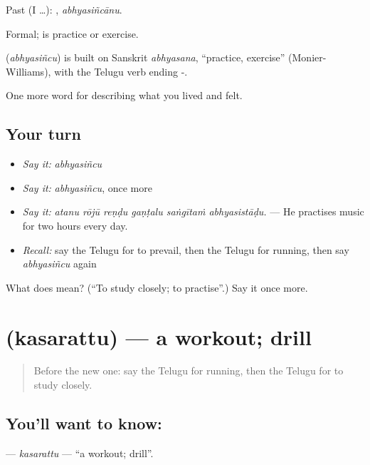 Past (I …): , \emph{abhyasiñcānu}.

Formal;  is practice or exercise.

\begin{cousinweb}
\textbf{} (\emph{abhyasiñcu}) is built on Sanskrit \emph{abhyasana}, \textquotedblleft{}practice, exercise\textquotedblright{} (Monier-Williams), with the Telugu verb ending -.
\end{cousinweb}

\begin{grammarlens}[title={What you've built}]
One more word for describing what you lived and felt.
\end{grammarlens}

\subsection*{Your turn}
\begin{itemize}
\raggedright
  \item \emph{Say it:} \emph{abhyasiñcu}
  \item \emph{Say it:} \emph{abhyasiñcu}, once more
  \item \emph{Say it:} \emph{atanu rōjū reṇḍu gaṇṭalu saṅgītaṁ abhyasistāḍu.} — He practises music for two hours every day.
  \item \emph{Recall:} say the Telugu for to prevail, then the Telugu for running, then say \emph{abhyasiñcu} again
\end{itemize}

\begin{tcolorbox}[breakable,colback=teal!4,colframe=teal!35!black,title={Before you move on}]
What does  mean? (\textquotedblleft{}To study closely; to practise\textquotedblright{}.) Say it once more.
\end{tcolorbox}
\section[\texorpdfstring{\te{కసరత్తు} (kasarattu)}{కసరత్తు (kasarattu)}]{ (kasarattu) — a workout; drill}

\label{lesson:TE-C545-kasarattu}



\begin{quote}
Before the new one: say the Telugu for running, then the Telugu for to study closely.
\end{quote}

\subsection*{You'll want to know: }
\textbf{} — \emph{kasarattu} — \textquotedblleft{}a workout; drill\textquotedblright{}.

